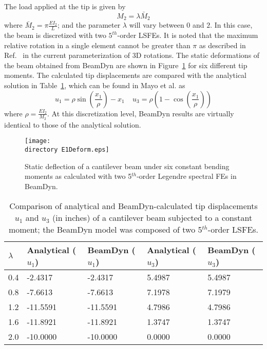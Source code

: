 The load applied at the tip is given by 
\begin{equation}
    \label{E1Load}
    M_2 = \lambda \bar{M}_2
\end{equation}
where $\bar{M}_2 = \pi \frac{EI_2}{L}$; and the parameter $\lambda$ will vary between $0$ and $2$. In 
this case, the beam is discretized with two $5^{th}$-order LSFEs. It is noted that the maximum relative rotation in a single element cannot be greater than $\pi$ as described in Ref.~\cite{Bauchau-etal:2008} in the current parameterization of 3D rotations. The static deformations of the beam obtained from BeamDyn are shown in
Figure~\ref{E1Deform} for six different tip moments.
The calculated tip displacements are compared with the analytical solution
in Table~\ref{E1u},
which can be found in Mayo et al.\cite{Mayo-etal:2004} as
\begin{equation}
    \label{E1Analytical}
    u_1 = \rho \sin \left( \frac{x_1}{\rho} \right) - x_1~~~~~u_3 = \rho
\left(1-\cos\left(\frac{x_1}{\rho}\right) \right)
\end{equation}
where $\rho = \frac{EI_2}{M_2}$. At this discretization level, BeamDyn results are virtually
identical to those of the analytical solution.

\begin{figure}
    \centering
    \texttt{[image: \\directory E1Deform.eps]}

    \caption{Static deflection of a cantilever beam under six constant
bending moments as calculated with two 5$^{th}$-order Legendre spectral
FEs in BeamDyn.}

    \label{E1Deform}
\end{figure}

\begin{table}[tbp]
\centering \caption{Comparison of analytical and BeamDyn-calculated tip
displacements $u_1$ and $u_3$ (in inches) of a cantilever beam subjected to a constant moment; the BeamDyn model was composed of two 5$^{th}$-order LSFEs.}
\label{E1u} 
	\begin{tabular}{| l | l | l | l | l | }
    	\hline
    	$\lambda$ & Analytical ($u_1$) & BeamDyn ($u_1$) & Analytical ($u_3$) & BeamDyn ($u_3$)  
	\\ \hline
    	0.4       & -2.4317    & -2.4317  & 5.4987     & 5.4987
	\\ \hline
    	0.8       & -7.6613    & -7.6613  & 7.1978     & 7.1979
	\\ \hline
    	1.2       & -11.5591   & -11.5591 & 4.7986     & 4.7986
	\\ \hline
    	1.6       & -11.8921   & -11.8921 & 1.3747     & 1.3747
	\\ \hline
    	2.0       & -10.0000   & -10.0000 & 0.0000     & 0.0000
	\\ \hline
    \end{tabular}
\end{table}

